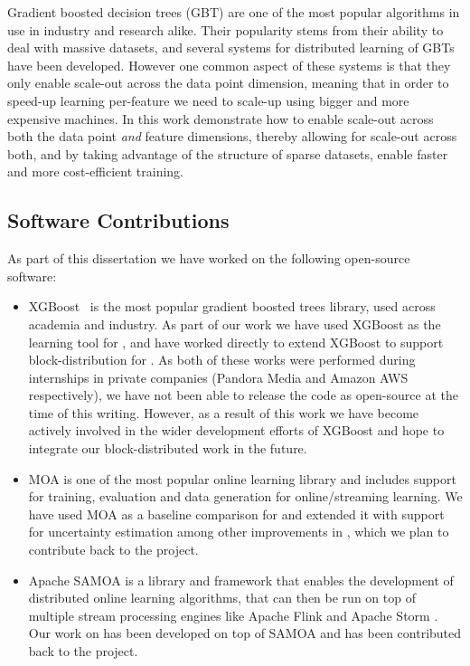 \begin{itemize}
	Gradient boosted decision trees (GBT) are one of the most popular algorithms in
	use in industry and research alike. Their popularity stems from their ability
	to deal with massive datasets, and several systems for distributed learning
	of GBTs have been developed. However one common aspect of these systems is that
	they only enable scale-out across the data point dimension, meaning that in
	order to speed-up learning per-feature we need to scale-up using bigger and more
	expensive machines. In this work demonstrate how to enable scale-out across
	both the data point \emph{and} feature dimensions, thereby allowing for scale-out
	across both, and by taking advantage of the structure of sparse datasets,
	enable faster and more cost-efficient training.
\end{itemize}

\subsection{Software Contributions}

As part of this dissertation we have worked on the following open-source software:

\begin{itemize}
	\item XGBoost~\cite{xgboost} is the most popular gradient boosted trees library,
	used across academia and industry. As part of our work we have used XGBoost as the
	learning tool for \sessionlength, and have worked directly to extend XGBoost to
	support block-distribution
	for \blockgbt. As both of these works were performed during internships in private
	companies (Pandora Media and Amazon AWS respectively), we have not been able to release
	the code as open-source at the time of this writing.
	However, as a result of this work we have become actively involved in the wider
	development efforts of XGBoost and hope to integrate our block-distributed
	work in the future.
	\item MOA \cite{moa-book} is one of the most popular online learning library and includes
	support for training, evaluation and data generation for online/streaming learning.
	We have used MOA as a baseline comparison for \boostvht and extended it with
	support for uncertainty estimation among other improvements in \uncertaintrees,
	which we plan to contribute back to the project.
	\item Apache SAMOA \cite{samoa} is a library and framework that enables the development
	of distributed online learning algorithms, that can then be run on top of multiple
	stream processing engines like Apache Flink \cite{flink} and Apache Storm \cite{storm}.
	Our work on \boostvht has been developed on top of SAMOA and has been contributed back
	to the project.
\end{itemize}

